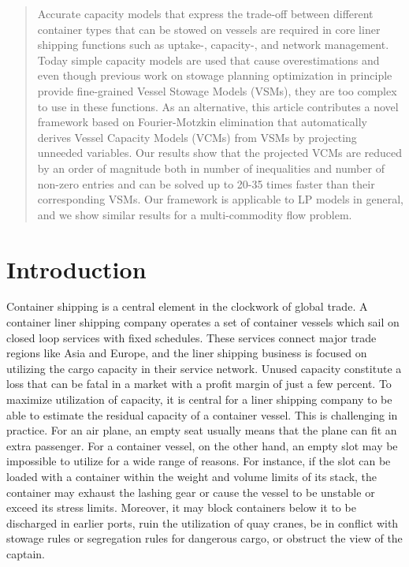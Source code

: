 
\usepackage{longtable}
\allowdisplaybreaks


  
\maketitle

\begin{abstract}
Accurate capacity models that express the trade-off between different container types that can be stowed on vessels are required in core liner shipping functions such as uptake-, capacity-, and network management. 
Today simple capacity models are used that cause overestimations and even though previous work on stowage planning optimization in principle provide fine-grained Vessel Stowage Models (VSMs), they are too complex to use in these functions. As an alternative, this article contributes a novel framework based on Fourier-Motzkin elimination that automatically derives Vessel Capacity Models (VCMs) from VSMs by projecting unneeded variables. Our results show that the projected VCMs are reduced by an order of magnitude both in number of inequalities and number of non-zero entries and can be solved up to 20-35 times faster than their corresponding VSMs. Our framework is applicable to LP models in general, and we show similar results for a multi-commodity flow problem.
\end{abstract}


\section{Introduction}
Container shipping is a central element in the clockwork of global trade\cite{EC13}. A container liner shipping company operates a set of container vessels which sail on closed loop services with fixed schedules. These services connect major trade regions like Asia and Europe, and the liner shipping business is focused on utilizing the cargo capacity in their service network. Unused capacity constitute a loss that can be fatal in a market with a profit margin of just a few percent.  
To maximize utilization of capacity, it is central for a liner shipping company to be able to estimate the residual capacity of a container vessel. This is challenging in practice. For an air plane, an empty seat usually means that the plane can fit an extra passenger. For a container vessel, on the other hand, an empty slot may be impossible to utilize for a wide range of reasons. For instance, if the slot can be loaded with a container within the weight and volume limits of its stack, the container may exhaust the lashing gear or cause the vessel to be unstable or exceed its stress limits. Moreover, it may block containers below it to be discharged in earlier ports, ruin the utilization of quay cranes, be in conflict with stowage rules or segregation rules for dangerous cargo, or obstruct the view of the captain. 

